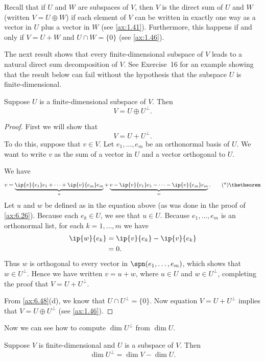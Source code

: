 Recall that if $U$ and $W$ are subspaces of $V$, then $V$ is the direct sum of
$U$ and $W$ (written $V=U\oplus W$) if each element of $V$ can be written in
exactly one way as a vector in $U$ plus a vector in $W$ (see \ref{ax:1.41}).
Furthermore, this happens if and only if $V=U+W$ and $U\cap W=\{0\}$ (see
\ref{ax:1.46}).

The next result shows that every finite-dimensional subspace of $V$ leads to a
natural direct sum decomposition of $V$. See Exercise~16 for an example showing
that the result below can fail without the hypothesis that the subspace $U$ is
finite-dimensional.

\begin{result}\label{ax:6.49}
Suppose $U$ is a finite-dimensional subspace of $V$. Then
\[ V = U\oplus U^\perp. \]
\end{result}

\begin{proof}
First we will show that
\[ V = U+U^\perp. \]
To do this, suppose that $v\in V$. Let $e_1,\dots,e_m$ be an orthonormal basis
of $U$. We want to write $v$ as the sum of a vector in $U$ and a vector
orthogonal to $U$.

We have
\begin{equation*}
v = \underbrace{\ip{v}{e_1}e_1+\cdots+\ip{v}{e_m}e_m}_{u}
  + \underbrace{v-\ip{v}{e_1}e_1-\cdots-\ip{v}{e_m}e_m}_{w}. \axeqtag
\end{equation*}
Let $u$ and $w$ be defined as in the equation above (as was done in the proof
of \ref{ax:6.26}). Because each $e_k\in U$, we see that $u\in U$. Because
$e_1,\dots,e_m$ is an orthonormal list, for each $k=1,\dots,m$ we have
\begin{align*}
\ip{w}{e_k} &= \ip{v}{e_k}-\ip{v}{e_k}\\
            &= 0.
\end{align*}
Thus $w$ is orthogonal to every vector in $\spn(e_1,\dots,e_m)$, which shows
that $w\in U^\perp$. Hence we have written $v=u+w$, where $u\in U$ and
$w\in U^\perp$, completing the proof that $V=U+U^\perp$.

From \ref{ax:6.48}(d), we know that $U\cap U^\perp=\{0\}$. Now equation
$V=U+U^\perp$ implies that $V=U\oplus U^\perp$ (see \ref{ax:1.46}).
\end{proof}

Now we can see how to compute $\dim U^\perp$ from $\dim U$.

\begin{result}\label{ax:6.51}
Suppose $V$ is finite-dimensional and $U$ is a subspace of $V$. Then
\[ \dim U^\perp = \dim V - \dim U. \]
\end{result}

